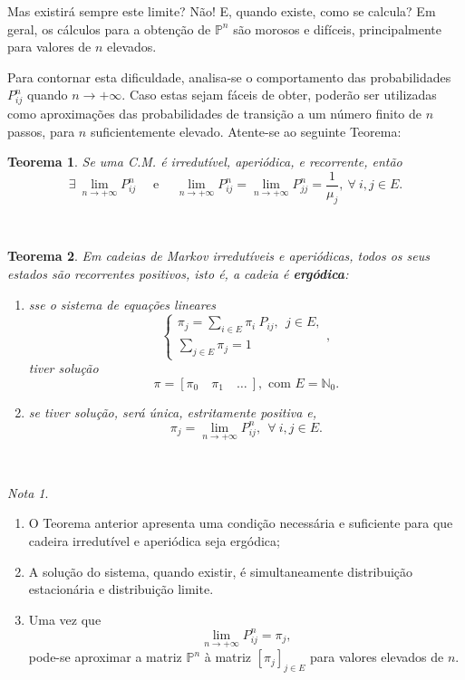 \documentclass[
  11pt,
  a4paper,
]{book}
\providecommand{\tightlist}{%
  \setlength{\itemsep}{0pt}\setlength{\parskip}{0pt}}
\newtheorem{theorem}{Teorema}[chapter]
\theoremstyle{definition}
\theoremstyle{definition}
\theoremstyle{definition}
\theoremstyle{definition}
\theoremstyle{remark}
\newtheorem*{remark}{Nota }
\begin{document}
Mas existirá sempre este limite? Não! E, quando existe, como se calcula? Em geral, os cálculos para a obtenção de \(\mathbb{P}^n\) são morosos e difíceis, principalmente para valores de \(n\) elevados.

Para contornar esta dificuldade, analisa-se o comportamento das probabilidades \(P_{ij}^n\) quando \(n \to +\infty\). Caso estas sejam fáceis de obter, poderão ser utilizadas como aproximações das probabilidades de transição a um número finito de \(n\) passos, para \(n\) suficientemente elevado. Atente-se ao seguinte Teorema:

\begin{theorem}
Se uma C.M. é irredutível, aperiódica, e recorrente, então
\[\exists ~ \lim\limits_{n \to +\infty} P_{ij}^n \quad \text{ e } \quad \lim\limits_{n \to +\infty} P_{ij}^n=\lim\limits_{n \to +\infty} P_{jj}^n=\dfrac{1}{\mu_j}, ~\forall ~i,j \in E.\]
\end{theorem}

\(\,\)

\begin{theorem}

Em cadeias de Markov irredutíveis e aperiódicas, todos os seus estados são recorrentes positivos, isto é, a cadeia é \textbf{ergódica}:

\begin{enumerate}
\def\labelenumi{(\roman{enumi})}
\tightlist
\item
  sse o sistema de equações lineares
  \[
  \begin{cases}
  \pi_j = \sum\limits_{i \in E} \pi_i~P_{ij}, ~~j \in E, \\
  \sum\limits_{j \in E} \pi_j =1
  \end{cases}, 
  \]
  tiver solução
  \[\pi = [\pi_0 \quad \pi_1 \quad \dots ~ ], \text{ com } E=\mathbb{N}_0.\]
\item
  se tiver solução, será única, estritamente positiva e,
  \[\pi_j=\lim\limits_{n \to +\infty} P_{ij}^n, ~~\forall ~i,j \in E.\]
\end{enumerate}

\end{theorem}

\(\,\)

\begin{remark}
\leavevmode

\begin{enumerate}
\def\labelenumi{\arabic{enumi}.}
\item
  O Teorema anterior apresenta uma condição necessária e suficiente para que cadeira irredutível e aperiódica seja ergódica;
\item
  A solução do sistema, quando existir, é simultaneamente distribuição estacionária e distribuição limite.
\item
  Uma vez que
  \[\lim\limits_{n \to +\infty} P_{ij}^n=\pi_j,\]
  pode-se aproximar a matriz \(\mathbb{P}^n\) à matriz \([\pi_j]_{j \in E}\) para valores elevados de \(n\).
\end{enumerate}

\end{remark}
\end{document}
